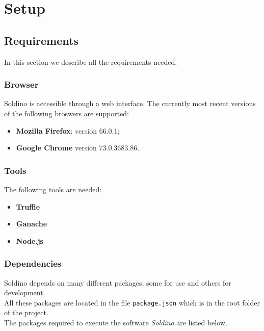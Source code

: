 \section{Setup} 
\subsection{Requirements}
In this section we describe all the requirements needed.
\subsubsection{Browser}
Soldino is accessible through a web interface. The currently most recent versions of the following broswers are supported:
\begin{itemize}
	\item \textbf{Mozilla Firefox}: version 66.0.1;
	\item \textbf{Google Chrome} version 73.0.3683.86.
\end{itemize}

\subsubsection{Tools}
The following tools are needed:
\begin{itemize}
	\item \textbf{Truffle}
	\item \textbf{Ganache}
	\item \textbf{Node.js}
\end{itemize}

\subsubsection{Dependencies}
Soldino depends on many different packages, some for use and others for development.\\
All these packages are located in the file \texttt{package.json} which is in the root folder of the project.\\
The packages required to execute the software \textit{Soldino} are listed below.\\

